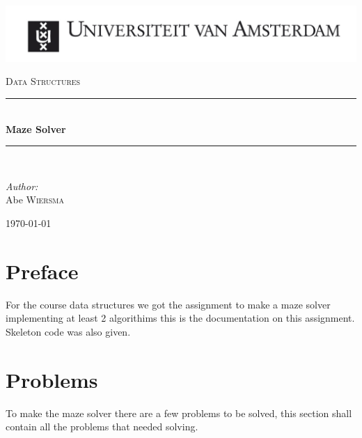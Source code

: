 \documentclass[pdftex,12pt,a4paper]{article}
\newcommand{\HRule}{\rule{\linewidth}{0.5mm}}
\begin{document}
\begin{titlepage}

\begin{flushleft}
\includegraphics[trim=23mm 0mm 0mm 0mm, width=1.2\textwidth]{./logo}\\[1cm]   
\end{flushleft}
\begin{center}
\textsc{\Large Data Structures}\\[0.5cm]


\HRule \\[0.4cm]
{ \huge \bfseries Maze Solver }\\[0.4cm]

\HRule \\[1.5cm]

\begin{minipage}{0.4\textwidth}
\begin{flushleft} \large
\emph{Author:}\\
 Abe \textsc{Wiersma}
\end{flushleft}
\end{minipage}
\begin{minipage}{0.4\textwidth}
\begin{flushright} \large
\end{flushright}
\end{minipage}

\vfill

{\large \today}

\end{center}
\end{titlepage}
\topmargin=-0.5in 
\textheight=25cm
\pagebreak

\tableofcontents
\pagebreak

\section{Preface}
For the course data structures we got the assignment to make a maze solver implementing at least 2 algorithims this is the documentation on this assignment.
Skeleton code was also given.

\section{Problems}
To make the maze solver there are a few problems to be solved, this section shall contain all the problems that needed solving.
\end{document}
